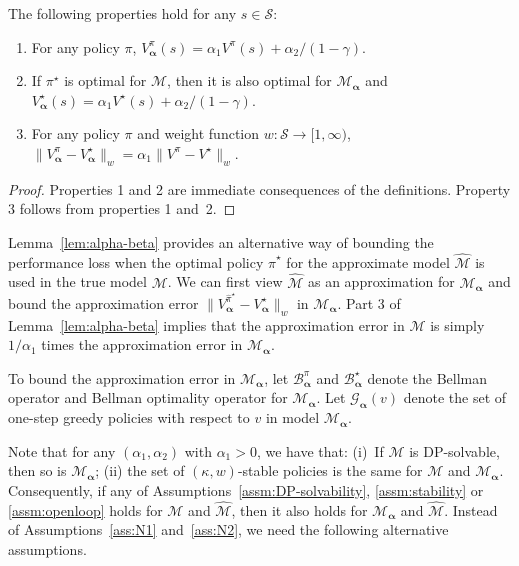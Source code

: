 \documentclass[letterpaper, 10pt]{IEEEtran}
\newcommand*\ALPHABET{\mathcal}
\newcommand*\BELLMAN{\mathscr{B}}
\newcommand*\tuple{\kappa, w}
\newcommand*\scale{(\alpha_1,\alpha_2)}
\begin{document}
\begin{lemma}\label{lem:alpha-beta}
   The following properties hold for any $s \in \ALPHABET S$:
   \begin{enumerate}
       \item For any policy $\pi$, 
       $V^\pi_{\boldsymbol{\alpha}}(s) = \alpha_1  V^\pi(s) + {\alpha_2}/{(1-\gamma)}$.
       \item  If $\pi^\star$ is optimal for $\ALPHABET M$, then it is also optimal for $\ALPHABET M_{\boldsymbol{\alpha}}$ and
       $V^\star_{\boldsymbol{\alpha}}(s) = \alpha_1  V^\star(s) + {\alpha_2}/{(1-\gamma)}$.
       \item For any policy $\pi$ and weight function $w \colon  \ALPHABET S \to [1, \infty)$, 
       $\| V^{\pi}_{\boldsymbol{\alpha}} - V^\star_{\boldsymbol{\alpha}}\|_w 
       = \alpha_1 \| V^\pi - V^\star \|_w$.
   \end{enumerate}
\end{lemma}
\begin{proof}
    Properties 1 and 2 are immediate consequences of the definitions. Property 3 follows from properties 1 and~2.
\end{proof}
Lemma~\ref{lem:alpha-beta} provides an alternative way of bounding the performance loss when the optimal policy $\hat \pi^\star$ for the approximate model $\hat {\ALPHABET M}$ is used in the true model ${\ALPHABET M}$. We can first view $\hat {\ALPHABET M}$ as an approximation for $\ALPHABET M_{\boldsymbol{\alpha}}$ and bound the approximation error $\|V^{\hat \pi^\star}_{\boldsymbol{\alpha}} - V^\star_{\boldsymbol{\alpha}}\|_w$ in $\ALPHABET M_{\boldsymbol{\alpha}}$. 
 Part 3 of Lemma~\ref{lem:alpha-beta} implies that the approximation error in $\ALPHABET M$ is   simply $1/\alpha_1$ times the approximation error in $\ALPHABET M_{\boldsymbol{\alpha}}$. 
 
 To bound the approximation error in $\ALPHABET M_{\boldsymbol{\alpha}}$, let $\BELLMAN^\pi_{\boldsymbol{\alpha}}$ and $\BELLMAN^\star_{\boldsymbol{\alpha}}$ denote the Bellman operator and Bellman optimality operator for $\ALPHABET M_{\boldsymbol{\alpha}}$. Let $\ALPHABET G_{\boldsymbol{\alpha}}(v)$ denote the set of one-step greedy policies with respect to $v$ in model $\ALPHABET M_{\boldsymbol{\alpha}}$. 
 
Note that for any $\scale$ with $\alpha_1 > 0$, we have that:
    (i)~If $\ALPHABET M$ is DP-solvable, then so is $\ALPHABET M_{\boldsymbol{\alpha}}$;
  (ii) the set of  $(\tuple)$-stable policies is the same  for $\ALPHABET M$ and $\ALPHABET M_{\boldsymbol{\alpha}}$. Consequently, if any of  Assumptions~\ref{assm:DP-solvability}, \ref{assm:stability} or \ref{assm:openloop} holds for  $\ALPHABET M$ and $\hat {\ALPHABET M}$, then it also holds for $\ALPHABET M_{\boldsymbol{\alpha}}$ and $\hat {\ALPHABET M}$.  Instead of Assumptions~\ref{ass:N1} and~\ref{ass:N2}, we need the following  alternative assumptions.
  
\end{document}
